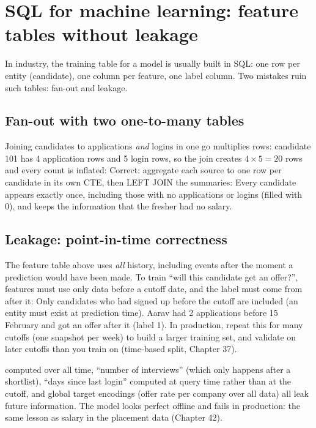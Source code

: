 \section{SQL for machine learning: feature tables without leakage}
In industry, the training table for a model is usually built in SQL: one row per entity (candidate), one column per feature, one label column. Two
mistakes ruin such tables: fan-out and leakage.

\subsection{Fan-out with two one-to-many tables}
Joining candidates to applications \emph{and} logins in one go multiplies rows: candidate 101 has 4 application rows and 5 login rows, so the join creates
$4 \times 5 = 20$ rows and every count is inflated:
Correct: aggregate each source to one row per candidate in its own CTE, then LEFT JOIN the summaries:
Every candidate appears exactly once, including those with no applications or logins (filled with 0), and  keeps the information
that the fresher had no salary.

\subsection{Leakage: point-in-time correctness}
The feature table above uses \emph{all} history, including events after the moment a prediction would have been made. To train ``will this candidate get
an offer?'', features must use only data before a cutoff date, and the label must come from after it:
Only candidates who had signed up before the cutoff are included (an entity must exist at prediction time). Aarav had 2 applications before 15 February
and got an offer after it (label 1). In production, repeat this for many cutoffs (one snapshot per week) to build a larger training set, and validate on
later cutoffs than you train on (time-based split, Chapter 37).

\begin{trap}
 computed over all time, ``number of interviews'' (which only happens after a shortlist), ``days since last login'' computed at query
time rather than at the cutoff, and global target encodings (offer rate per company over all data) all leak future information. The model looks perfect
offline and fails in production: the same lesson as salary in the placement data (Chapter 42).
\end{trap}

